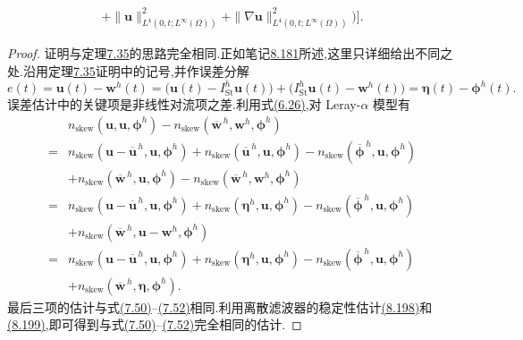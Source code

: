 \begin{theorem}
\begin{equation}
\begin{aligned}
 +\|\bm{u}\|_{L^4(0,t;L^\infty(\Omega))}^2
 +\|\nabla\bm{u}\|_{L^4(0,t;L^\infty(\Omega))}^2
 \Bigr)\Biggr].
\end{aligned}
\end{equation}
\begin{proof}
证明与定理\hyperref[thm:time-dependent-fem-velocity-error]{7.35}的思路完全相同.正如笔记\hyperref[note:leray-alpha-fem-error-analysis]{8.181}所述,这里只详细给出不同之处.沿用定理\hyperref[thm:time-dependent-fem-velocity-error]{7.35}证明中的记号,并作误差分解
\[
 e(t)=\bm{u}(t)-\bm{w}^h(t)
 =\bigl(\bm{u}(t)-I_{\mathrm{St}}^h\bm{u}(t)\bigr)
  +\bigl(I_{\mathrm{St}}^h\bm{u}(t)-\bm{w}^h(t)\bigr)
 =\symbf{\eta}(t)-\symbf{\phi}^h(t).
\]
误差估计中的关键项是非线性对流项之差.利用式\hyperref[eq:steady-ns-convection-zero-rot-skew]{(6.26)},对 Leray-$\alpha$ 模型有
\begin{equation}\label{eq:leray-alpha-fem-convection-decomposition}
\begin{aligned}
 &n_{\mathrm{skew}}(\bm{u},\bm{u},\symbf{\phi}^h)
  -n_{\mathrm{skew}}(\overline{\bm{w}}^{\,h},
                     \bm{w}^h,\symbf{\phi}^h)\\
 ={}&n_{\mathrm{skew}}(\bm{u}-\overline{\bm{u}}^{\,h},
                       \bm{u},\symbf{\phi}^h)
  +n_{\mathrm{skew}}(\overline{\bm{u}}^{\,h},
                       \bm{u},\symbf{\phi}^h)
  -n_{\mathrm{skew}}(\overline{\symbf{\phi}}^{\,h},
                       \bm{u},\symbf{\phi}^h)\\
 &+n_{\mathrm{skew}}(\overline{\bm{w}}^{\,h},
                     \bm{u},\symbf{\phi}^h)
  -n_{\mathrm{skew}}(\overline{\bm{w}}^{\,h},
                     \bm{w}^h,\symbf{\phi}^h)\\
 ={}&n_{\mathrm{skew}}(\bm{u}-\overline{\bm{u}}^{\,h},
                       \bm{u},\symbf{\phi}^h)
  +n_{\mathrm{skew}}(\symbf{\eta}^h,
                       \bm{u},\symbf{\phi}^h)
  -n_{\mathrm{skew}}(\overline{\symbf{\phi}}^{\,h},
                       \bm{u},\symbf{\phi}^h)\\
 &+n_{\mathrm{skew}}(\overline{\bm{w}}^{\,h},
                     \bm{u}-\bm{w}^h,\symbf{\phi}^h)\\
 ={}&n_{\mathrm{skew}}(\bm{u}-\overline{\bm{u}}^{\,h},
                       \bm{u},\symbf{\phi}^h)
  +n_{\mathrm{skew}}(\symbf{\eta}^h,
                       \bm{u},\symbf{\phi}^h)
  -n_{\mathrm{skew}}(\overline{\symbf{\phi}}^{\,h},
                       \bm{u},\symbf{\phi}^h)\\
 &+n_{\mathrm{skew}}(\overline{\bm{w}}^{\,h},
                     \symbf{\eta},\symbf{\phi}^h).
\end{aligned}
\end{equation}
最后三项的估计与式\hyperref[eq:time-dependent-fem-error-nonlinear-eta]{(7.50)}--\hyperref[eq:time-dependent-fem-error-nonlinear-projection]{(7.52)}相同.利用离散滤波器的稳定性估计\hyperref[eq:leray-alpha-discrete-filter-L2-stability]{(8.198)}和\hyperref[eq:leray-alpha-discrete-filter-H1-stability]{(8.199)},即可得到与式\hyperref[eq:time-dependent-fem-error-nonlinear-eta]{(7.50)}--\hyperref[eq:time-dependent-fem-error-nonlinear-projection]{(7.52)}完全相同的估计.


\end{proof}
\end{theorem}
